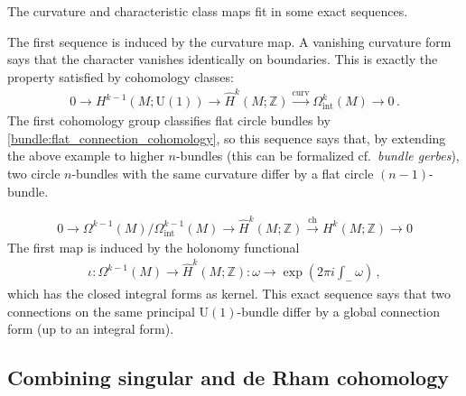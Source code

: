     The curvature and characteristic class maps fit in some exact sequences.
    \begin{property}
        The first sequence is induced by the curvature map. A vanishing curvature form says that the character vanishes identically on boundaries. This is exactly the property satisfied by cohomology classes:
        \begin{gather}
            0\longrightarrow H^{k-1}(M;\mathrm{U}(1))\longrightarrow\hat{H}^k(M;\mathbb{Z})\overset{\mathrm{curv}}{\longrightarrow}\Omega^k_\text{int}(M)\longrightarrow0\,.
        \end{gather}
        The first cohomology group classifies flat circle bundles by \cref{bundle:flat_connection_cohomology}, so this sequence says that, by extending the above example to higher $n$-bundles (this can be formalized cf.~\textit{bundle gerbes}), two circle $n$-bundles with the same curvature differ by a flat circle $(n-1)$-bundle.
    \end{property}
    \begin{property}
        \begin{gather}
            0\longrightarrow \Omega^{k-1}(M)/\Omega^{k-1}_\text{int}(M)\longrightarrow\hat{H}^k(M;\mathbb{Z})\overset{\mathrm{ch}}{\longrightarrow} H^k(M;\mathbb{Z})\longrightarrow0
        \end{gather}
        The first map is induced by the holonomy functional
        \begin{gather}
            \iota:\Omega^{k-1}(M)\rightarrow\hat{H}^k(M;\mathbb{Z}):\omega\rightarrow\exp\left(2\pi i\int_-\omega\right)\,,
        \end{gather}
        which has the closed integral forms as kernel. This exact sequence says that two connections on the same principal $\mathrm{U}(1)$-bundle differ by a global connection form (up to an integral form).
    \end{property}

\subsection{Combining singular and de Rham cohomology}

